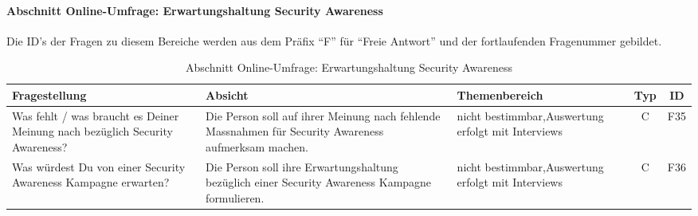 \documentclass[../../main.tex]{subfiles}
\begin{document}
\paragraph*{Abschnitt Online-Umfrage: Erwartungshaltung Security Awareness}\mbox{}

\begin{sloppypar}
Die ID's der Fragen zu diesem Bereiche werden aus dem Präfix "`F"' für "`Freie Antwort"' und der fortlaufenden Fragenummer gebildet.
\end{sloppypar}


\sloppy 

\begin{table}[H]
\tablefontsize	
\centering
\caption{Abschnitt Online-Umfrage: Erwartungshaltung Security Awareness}
\label{Erwartungshaltung Security Awareness}
\begin{tabular}{ |p{5.5cm}|p{5.5cm}|p{2.5cm}|c|c|}

\hline
\tableheaderbgcolor
\textbf{Fragestellung} & \textbf{Absicht} & \textbf{Themenbereich} & \textbf{Typ} & \textbf{ID}\\ 
\hline
Was fehlt / was braucht es Deiner Meinung nach bezüglich Security Awareness? & Die Person soll auf ihrer Meinung nach fehlende Massnahmen für Security Awareness aufmerksam machen. & nicht bestimmbar,\newline Auswertung erfolgt mit Interviews & C & F35 \\
\hline

Was würdest Du von einer Security Awareness Kampagne erwarten? & Die Person soll ihre Erwartungshaltung bezüglich einer Security Awareness Kampagne formulieren. & nicht bestimmbar,\newline Auswertung erfolgt mit Interviews & C & F36 \\
\hline

\end{tabular}
\end{table}
\end{document}
